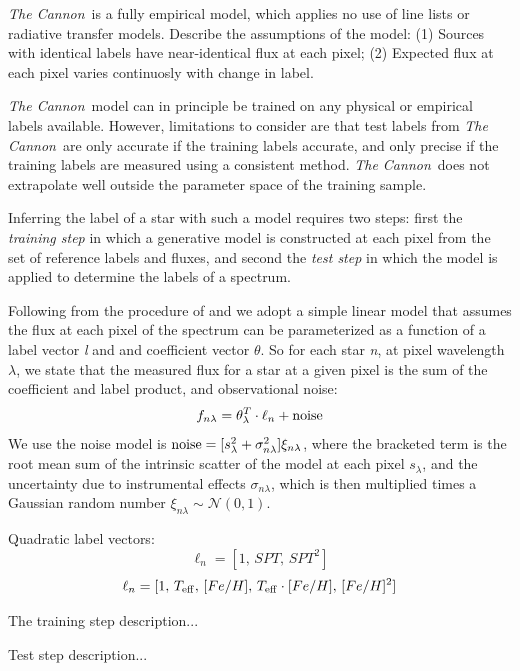 \documentclass[modern]{aastex62}
\newcommand{\thecannon}{\textsl{The Cannon}}
\begin{document}
\thecannon\ is a fully empirical model, which applies no use of line lists or radiative transfer models. Describe the assumptions of the model: (1) Sources with identical labels have near-identical flux at each pixel; (2) Expected flux at each pixel varies continuosly with change in label. 

\thecannon\ model can in principle be trained on any physical or empirical labels available. However, limitations to consider are that test labels from \thecannon\ are only accurate if the training labels accurate, and only precise if the training labels are measured using a consistent method. \thecannon\ does not extrapolate well outside the parameter space of the training sample.

Inferring the label of a star with such a model requires two steps: first the \emph{training step} in which a generative model is constructed at each pixel from the set of reference labels and fluxes, and second the \emph{test step} in which the model is applied to determine the labels of a spectrum.

Following from the procedure of \citealt{Ness:2015} and \citealt{Ho:2017a} we adopt a simple linear model that assumes the flux at each pixel of the spectrum can be parameterized as a function of a label vector \emph{l} and and coefficient vector \emph{$\theta$}. So for each star \emph{n}, at pixel wavelength \emph{$\lambda$}, we state that the measured flux for a star at a given pixel is the sum of the coefficient and label product, and observational noise:
\begin{equation}
	f_{n\lambda} = \theta_{\lambda}^{T} \cdot \ell_{n} + {\rm noise}
\end{equation}
We use the noise model is ${\rm noise}=[s_{\lambda}^2 + \sigma_{n\lambda}^2]\xi_{n\lambda}$, where the bracketed term is the root mean sum of the intrinsic scatter of the model at each pixel \emph{$s_{\lambda}$}, and the uncertainty due to instrumental effects \emph{$\sigma_{n\lambda}$}, which is then multiplied times a Gaussian random number $\xi_{n\lambda} \sim \mathcal{N} (0,1)$. 

Quadratic label vectors:
	\[\ell_{n} = [1, \, SPT, \, SPT^{2}] \]
	\[\ell_{n} = [1, \, T_{\rm eff}, \, [Fe/H], \, T_{\rm eff} \cdot [Fe/H], \, [Fe/H]^{2}] \]

The training step description...

Test step description...


\end{document}
